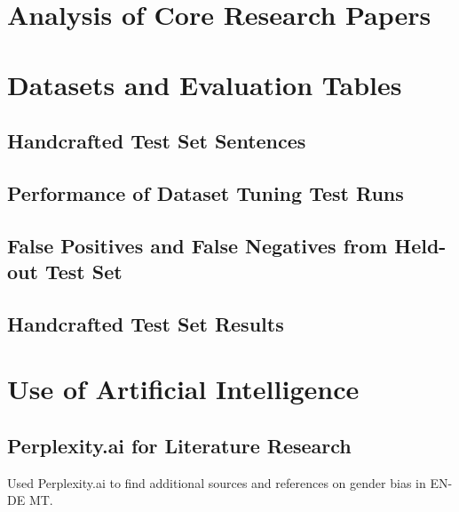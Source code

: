 \appendix
\renewcommand{\thesection}{\Alph{section}}

\section{Analysis of Core Research Papers}\label{appendix:analysis_papers}


\section{Datasets and Evaluation Tables}\label{appendix:datasets}

\subsection{Handcrafted Test Set Sentences}
\label{tab:handcrafted_testset}


\subsection{Performance of Dataset Tuning Test Runs}
\label{appendix:dataset_tuning_table}


\subsection{False Positives and False Negatives from Held-out Test Set}
\label{tab:fp_fn_table}


\subsection{Handcrafted Test Set Results}
\label{tab:handcrafted_testset_results}



\section{Use of Artificial Intelligence}\label{appendix:artificial_intelligece}

\subsection{Perplexity.ai for Literature Research}
Used Perplexity.ai to find additional sources and references on gender bias in EN-DE MT.

